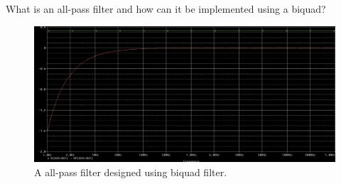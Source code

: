\documentclass[11pt]{article}
\begin{document}
\begin{question}
\begin{subquestion}{What is an all-pass filter and how can it be implemented using a biquad?}
{\begin{figure}[H]
\begin{center}
                    \includegraphics[scale=0.25]{Fig/Q6zb.png}
                    \caption{A all-pass filter designed using biquad filter.}
                \end{center}
            \end{figure}
        }
    \end{subquestion}

\end{question}



\begin{question}


\end{question}

\end{document}

